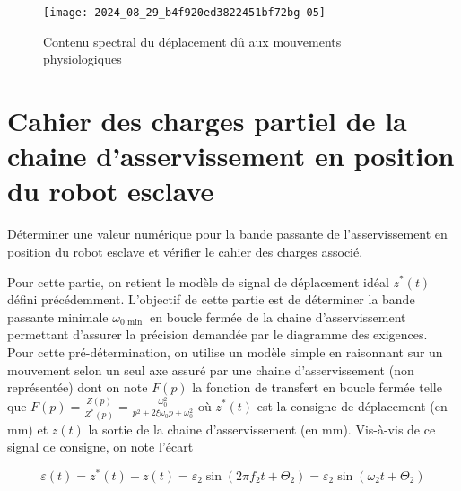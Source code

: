 

\begin{figure}[!h]
\centering
\texttt{[image: 2024\_08\_29\_b4f920ed3822451bf72bg-05]}
\caption{\label{fig_05} Contenu spectral du déplacement dû aux mouvements physiologiques}
\end{figure}


\section{Cahier des charges partiel de la chaine d'asservissement en position du robot esclave}
\begin{obj}
Déterminer une valeur numérique pour la bande passante de l'asservissement en position du robot esclave et vérifier le cahier des charges associé.
\end{obj}

Pour cette partie, on retient le modèle de signal de déplacement idéal $z^{*}(t)$ défini précédemment. L'objectif de cette partie est de déterminer la bande passante minimale $\omega_{0 \text { min }}$ en boucle fermée de la chaine d'asservissement permettant d'assurer la précision demandée par le diagramme des exigences.\\
Pour cette pré-détermination, on utilise un modèle simple en raisonnant sur un mouvement selon un seul axe assuré par une chaine d'asservissement (non représentée) dont on note $F(p)$ la fonction de transfert en boucle fermée telle que $F(p)=\frac{Z(p)}{Z^{*}(p)}=\frac{\omega_{0}^{2}}{p^{2}+2 \xi \omega_{0} p+\omega_{0}^{2}}$ où $z^{*}(t)$ est la consigne de déplacement (en mm) et $z(t)$ la sortie de la chaine d'asservissement (en mm). Vis-à-vis de ce signal de consigne, on note l'écart

$$
\varepsilon(t)=z^{*}(t)-z(t)=\varepsilon_{2} \sin \left(2 \pi f_{2} t+\Theta_{2}\right)=\varepsilon_{2} \sin \left(\omega_{2} t+\Theta_{2}\right)
$$

